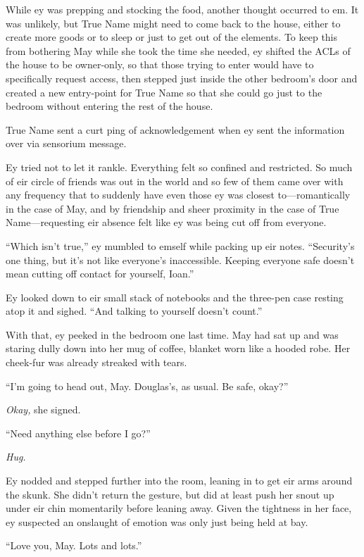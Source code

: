 While ey was prepping and stocking the food, another thought occurred to em. It was unlikely, but True Name might need to come back to the house, either to create more goods or to sleep or just to get out of the elements. To keep this from bothering May while she took the time she needed, ey shifted the ACLs of the house to be owner-only, so that those trying to enter would have to specifically request access, then stepped just inside the other bedroom's door and created a new entry-point for True Name so that she could go just to the bedroom without entering the rest of the house.

True Name sent a curt ping of acknowledgement when ey sent the information over via sensorium message.

Ey tried not to let it rankle. Everything felt so confined and restricted. So much of eir circle of friends was out in the world and so few of them came over with any frequency that to suddenly have even those ey was closest to—romantically in the case of May, and by friendship and sheer proximity in the case of True Name—requesting eir absence felt like ey was being cut off from everyone.

``Which isn't true,'' ey mumbled to emself while packing up eir notes. ``Security's one thing, but it's not like everyone's inaccessible. Keeping everyone safe doesn't mean cutting off contact for yourself, Ioan.''

Ey looked down to eir small stack of notebooks and the three-pen case resting atop it and sighed. ``And talking to yourself doesn't count.''

With that, ey peeked in the bedroom one last time. May had sat up and was staring dully down into her mug of coffee, blanket worn like a hooded robe. Her cheek-fur was already streaked with tears.

``I'm going to head out, May. Douglas's, as usual. Be safe, okay?''

\emph{Okay,} she signed.

``Need anything else before I go?''

\emph{Hug.}

Ey nodded and stepped further into the room, leaning in to get eir arms around the skunk. She didn't return the gesture, but did at least push her snout up under eir chin momentarily before leaning away. Given the tightness in her face, ey suspected an onslaught of emotion was only just being held at bay.

``Love you, May. Lots and lots.''

